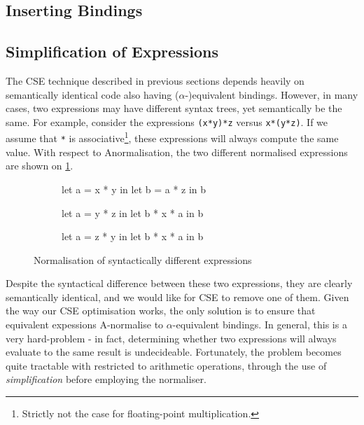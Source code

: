\subsection{Inserting Bindings}


\subsection{Simplification of Expressions}
\label{sec:simplification-of-expressions}

The CSE technique described in previous sections depends heavily on
semantically identical code also having ($\alpha$-)equivalent
bindings.  However, in many cases, two expressions may have different
syntax trees, yet semantically be the same.  For example, consider the
expressions \texttt{(x*y)*z} versus \texttt{x*(y*z)}.  If we assume
that \texttt{*} is associative\footnote{Strictly not the case for
  floating-point multiplication.}, these expressions will always
compute the same value.  With respect to Anormalisation, the two
different normalised expressions are shown on
\cref{fig:differing-normalisation}.

\begin{figure}
\begin{subfigure}[t]{.33\textwidth}
\centering
\begin{colorcode}
let a = x * y in
let b = a * z in
b
\end{colorcode}
\end{subfigure}%
\begin{subfigure}[t]{.33\textwidth}
\centering
\begin{colorcode}
let a = y * z in
let b * x * a in
b
\end{colorcode}
\end{subfigure}%
\begin{subfigure}[t]{.33\textwidth}
\centering
\begin{colorcode}
let a = z * y in
let b * x * a in
b
\end{colorcode}
\end{subfigure}
\caption{Normalisation of syntactically different expressions}
\label{fig:differing-normalisation}
\end{figure}

Despite the syntactical difference between these two expressions, they
are clearly semantically identical, and we would like for CSE to
remove one of them.  Given the way our CSE optimisation works, the
only solution is to ensure that equivalent expessions A-normalise to
$\alpha$-equivalent bindings.  In general, this is a very hard-problem
- in fact, determining whether two expressions will always evaluate to
the same result is undecideable.
Fortunately, the problem becomes quite tractable with restricted to
arithmetic operations, through the use of \textit{simplification}
before employing the normaliser.

